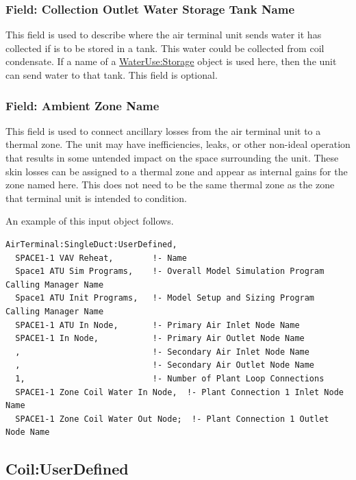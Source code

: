 \subsubsection{Field: Collection Outlet Water Storage Tank Name}\label{field-collection-outlet-water-storage-tank-name-1}

This field is used to describe where the air terminal unit sends water it has collected if is to be stored in a tank. This water could be collected from coil condensate. If a name of a \hyperref[waterusestorage]{WaterUse:Storage} object is used here, then the unit can send water to that tank. This field is optional.

\subsubsection{Field: Ambient Zone Name}\label{field-ambient-zone-name-1}

This field is used to connect ancillary losses from the air terminal unit to a thermal zone. The unit may have inefficiencies, leaks, or other non-ideal operation that results in some untended impact on the space surrounding the unit. These skin losses can be assigned to a thermal zone and appear as internal gains for the zone named here. This does not need to be the same thermal zone as the zone that terminal unit is intended to condition.

An example of this input object follows.

\begin{lstlisting}
AirTerminal:SingleDuct:UserDefined,
  SPACE1-1 VAV Reheat,        !- Name
  Space1 ATU Sim Programs,    !- Overall Model Simulation Program Calling Manager Name
  Space1 ATU Init Programs,   !- Model Setup and Sizing Program Calling Manager Name
  SPACE1-1 ATU In Node,       !- Primary Air Inlet Node Name
  SPACE1-1 In Node,           !- Primary Air Outlet Node Name
  ,                           !- Secondary Air Inlet Node Name
  ,                           !- Secondary Air Outlet Node Name
  1,                          !- Number of Plant Loop Connections
  SPACE1-1 Zone Coil Water In Node,  !- Plant Connection 1 Inlet Node Name
  SPACE1-1 Zone Coil Water Out Node;  !- Plant Connection 1 Outlet Node Name
\end{lstlisting}

\subsection{Coil:UserDefined}\label{coiluserdefined}


